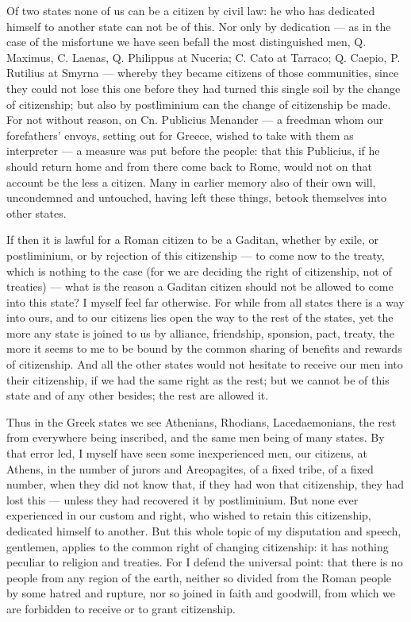  Of two states none of us can be a citizen by civil law: he who has dedicated himself to another state can not be of this. Nor only by dedication --- as in the case of the misfortune we have seen befall the most distinguished men, Q. Maximus, C. Laenas, Q. Philippus at Nuceria; C. Cato at Tarraco; Q. Caepio, P. Rutilius at Smyrna --- whereby they became citizens of those communities, since they could not lose this one before they had turned this single soil by the change of citizenship; but also by postliminium can the change of citizenship be made. For not without reason, on Cn. Publicius Menander --- a freedman whom our forefathers' envoys, setting out for Greece, wished to take with them as interpreter --- a measure was put before the people: that this Publicius, if he should return home and from there come back to Rome, would not on that account be the less a citizen. Many in earlier memory also of their own will, uncondemned and untouched, having left these things, betook themselves into other states.

 If then it is lawful for a Roman citizen to be a Gaditan, whether by exile, or postliminium, or by rejection of this citizenship --- to come now to the treaty, which is nothing to the case (for we are deciding the right of citizenship, not of treaties) --- what is the reason a Gaditan citizen should not be allowed to come into this state? I myself feel far otherwise. For while from all states there is a way into ours, and to our citizens lies open the way to the rest of the states, yet the more any state is joined to us by alliance, friendship, sponsion, pact, treaty, the more it seems to me to be bound by the common sharing of benefits and rewards of citizenship. And all the other states would not hesitate to receive our men into their citizenship, if we had the same right as the rest; but we cannot be of this state and of any other besides; the rest are allowed it.

 Thus in the Greek states we see Athenians, Rhodians, Lacedaemonians, the rest from everywhere being inscribed, and the same men being of many states. By that error led, I myself have seen some inexperienced men, our citizens, at Athens, in the number of jurors and Areopagites, of a fixed tribe, of a fixed number, when they did not know that, if they had won that citizenship, they had lost this --- unless they had recovered it by postliminium. But none ever experienced in our custom and right, who wished to retain this citizenship, dedicated himself to another. But this whole topic of my disputation and speech, gentlemen, applies to the common right of changing citizenship: it has nothing peculiar to religion and treaties. For I defend the universal point: that there is no people from any region of the earth, neither so divided from the Roman people by some hatred and rupture, nor so joined in faith and goodwill, from which we are forbidden to receive or to grant citizenship.

